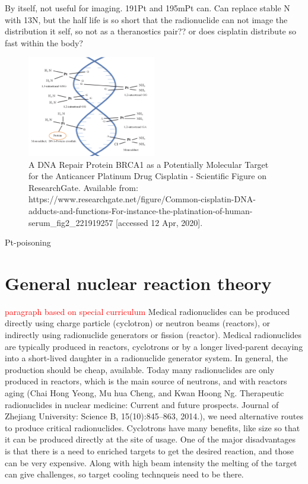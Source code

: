 \documentclass[a4paper,11pt,twoside]{book}
\begin{document}
By itself, not useful for imaging. 191Pt and 195mPt can. Can replace stable N with 13N, but the half life is so short that the radionuclide can not image the distribution it self, so not as a theranostics pair?? or does cisplatin distribute so fast within the body? 



\begin{figure}
    \centering
    \includegraphics[width=0.5\textwidth]{Theory/cisplatin_DNA.png}
    \caption{A DNA Repair Protein BRCA1 as a Potentially Molecular Target for the Anticancer Platinum Drug Cisplatin - Scientific Figure on ResearchGate. Available from: https://www.researchgate.net/figure/Common-cisplatin-DNA-adducts-and-functions-For-instance-the-platination-of-human-serum_fig2_221919257 [accessed 12 Apr, 2020]. }
    \label{fig:cisplatin_DNA}
\end{figure}
Pt-poisoning 




\chapter{General nuclear reaction theory}

\textcolor{red}{paragraph based on special curriculum}
Medical radionuclides can be produced directly using charge particle (cyclotron) or neutron beams (reactors), or indirectly using radionuclide generators or fission (reactor). Medical radionuclides are typically produced in reactors, cyclotrons or by a longer lived-parent decaying into a short-lived daughter in a radionuclide generator system. In general, the production should be cheap, available. Today many radionuclides are only produced in reactors, which is the main source of neutrons, and with reactors aging (Chai Hong Yeong, Mu hua Cheng, and Kwan Hoong Ng. Therapeutic radionuclides in nuclear medicine: Current and future prospects. Journal of Zhejiang University: Science B,
15(10):845–863, 2014.), we need alternative routes to produce critical radionuclides. Cyclotrons have many benefits, like size so that it can be produced directly at the site of usage. One of the major disadvantages is that there is a need to enriched targets to get the desired reaction, and those can be very expensive. Along with high beam intensity the melting of the target can give challenges, so target cooling technqueis need to be there.    
\end{document}
